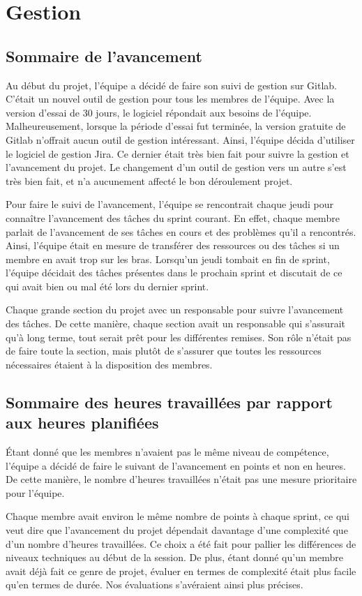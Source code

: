 \section{Gestion}
    \subsection{Sommaire de l'avancement}
    Au début du projet, l'équipe a décidé de faire son suivi de gestion sur Gitlab. C'était un nouvel outil de gestion pour tous les membres de l'équipe. Avec la version d'essai de 30 jours, le logiciel répondait aux besoins de l'équipe. Malheureusement, lorsque la période d'essai fut terminée, la version gratuite de Gitlab n'offrait aucun outil de gestion intéressant. Ainsi, l'équipe décida d'utiliser le logiciel de gestion Jira. Ce dernier était très bien fait pour suivre la gestion et l'avancement du projet. Le changement d'un outil de gestion vers un autre s'est très bien fait, et n'a aucunement affecté le bon déroulement projet.

    Pour faire le suivi de l'avancement, l'équipe se rencontrait chaque jeudi pour connaître l'avancement des tâches du sprint courant. En effet, chaque membre parlait de l'avancement de ses tâches en cours et des problèmes qu'il a rencontrés. Ainsi, l'équipe était en mesure de transférer des ressources ou des tâches si un membre en avait trop sur les bras. Lorsqu'un jeudi tombait en fin de sprint, l'équipe décidait des tâches présentes dans le prochain sprint et discutait de ce qui avait bien ou mal été lors du dernier sprint.
    
    Chaque grande section du projet avec un responsable pour suivre l'avancement des tâches. De cette manière, chaque section avait un responsable qui s'assurait qu'à long terme, tout serait prêt pour les différentes remises. Son rôle n'était pas de faire toute la section, mais plutôt de s'assurer que toutes les ressources nécessaires étaient à la disposition des membres.

    \subsection{Sommaire des heures travaillées par rapport aux heures planifiées}
    Étant donné que les membres n'avaient pas le même niveau de compétence, l'équipe a décidé de faire le suivant de l'avancement en points et non en heures. De cette manière, le nombre d'heures travaillées n'était pas une mesure prioritaire pour l'équipe.

    Chaque membre avait environ le même nombre de points à chaque sprint, ce qui veut dire que l'avancement du projet dépendait davantage d'une complexité que d'un nombre d'heures travaillées. Ce choix a été fait pour pallier les différences de niveaux techniques au début de la session. De plus, étant donné qu'un membre avait déjà fait ce genre de projet, évaluer en termes de complexité était plus facile qu'en termes de durée. Nos évaluations s'avéraient ainsi plus précises.

